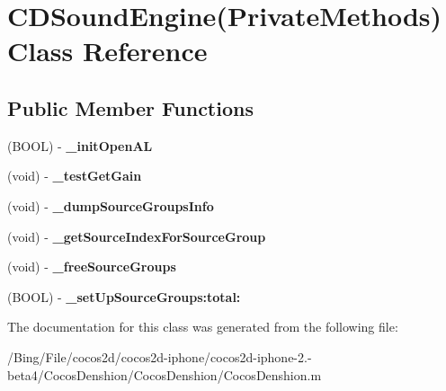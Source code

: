 \hypertarget{interface_c_d_sound_engine_07_private_methods_08}{\section{C\-D\-Sound\-Engine(Private\-Methods) Class Reference}
\label{interface_c_d_sound_engine_07_private_methods_08}
}
\subsection*{Public Member Functions}
\begin{DoxyCompactItemize}
\item 
\hypertarget{interface_c_d_sound_engine_07_private_methods_08_aefd4b4cb3b3a07068e2438b2b4f2a3c8}{(B\-O\-O\-L) -\/ {\bfseries \-\_\-init\-Open\-A\-L}}\label{interface_c_d_sound_engine_07_private_methods_08_aefd4b4cb3b3a07068e2438b2b4f2a3c8}

\item 
\hypertarget{interface_c_d_sound_engine_07_private_methods_08_a7363c48562f49a17d3d82079cd6bce4b}{(void) -\/ {\bfseries \-\_\-test\-Get\-Gain}}\label{interface_c_d_sound_engine_07_private_methods_08_a7363c48562f49a17d3d82079cd6bce4b}

\item 
\hypertarget{interface_c_d_sound_engine_07_private_methods_08_a8a0e3e538ac804c39b0b9ac53e7fb13f}{(void) -\/ {\bfseries \-\_\-dump\-Source\-Groups\-Info}}\label{interface_c_d_sound_engine_07_private_methods_08_a8a0e3e538ac804c39b0b9ac53e7fb13f}

\item 
\hypertarget{interface_c_d_sound_engine_07_private_methods_08_a65c2b77030a096474b6962bb9b3a8294}{(void) -\/ {\bfseries \-\_\-get\-Source\-Index\-For\-Source\-Group}}\label{interface_c_d_sound_engine_07_private_methods_08_a65c2b77030a096474b6962bb9b3a8294}

\item 
\hypertarget{interface_c_d_sound_engine_07_private_methods_08_a1d1eb0f2b085ebb69b25239e453ec448}{(void) -\/ {\bfseries \-\_\-free\-Source\-Groups}}\label{interface_c_d_sound_engine_07_private_methods_08_a1d1eb0f2b085ebb69b25239e453ec448}

\item 
\hypertarget{interface_c_d_sound_engine_07_private_methods_08_a77d274ded220f25a298482845ac81d3e}{(B\-O\-O\-L) -\/ {\bfseries \-\_\-set\-Up\-Source\-Groups\-:total\-:}}\label{interface_c_d_sound_engine_07_private_methods_08_a77d274ded220f25a298482845ac81d3e}

\end{DoxyCompactItemize}


The documentation for this class was generated from the following file\-:\begin{DoxyCompactItemize}
\item 
/\-Bing/\-File/cocos2d/cocos2d-\/iphone/cocos2d-\/iphone-\/2.-\/beta4/\-Cocos\-Denshion/\-Cocos\-Denshion/Cocos\-Denshion.\-m\end{DoxyCompactItemize}
